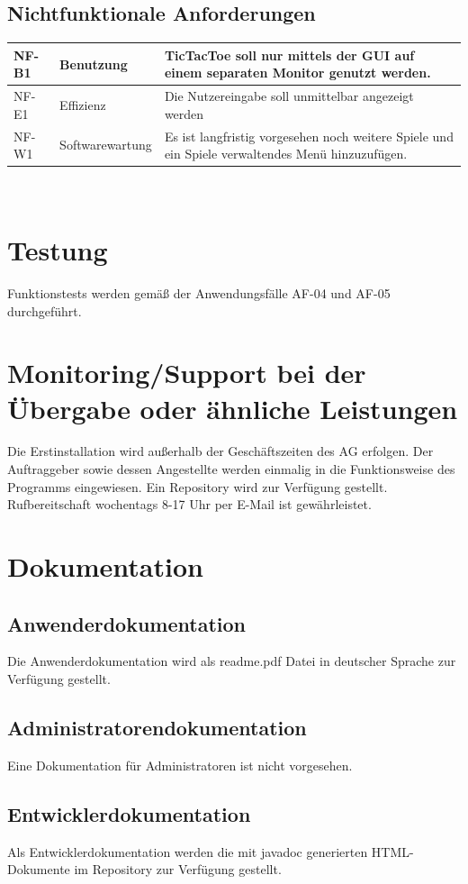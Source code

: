 \documentclass[12pt]{article}
\begin{document}
\subsection{Nichtfunktionale Anforderungen} 
\begin{tabularx}{\textwidth}{|X|X|X|} \hline
NF-B1&Benutzung&\Gls{TicTacToe} soll nur mittels der GUI auf einem separaten Monitor genutzt werden.\\ \hline
NF-E1&Effizienz&Die Nutzereingabe soll unmittelbar angezeigt werden\\ \hline
NF-W1&Softwarewartung&Es ist langfristig vorgesehen noch weitere Spiele und ein Spiele verwaltendes Menü hinzuzufügen. \\ \hline
\end{tabularx}\\
\section{Testung}
Funktionstests werden gemäß der Anwendungsfälle AF-04 und AF-05 durchgeführt.

\section{Monitoring/Support bei der Übergabe oder ähnliche Leistungen}
Die Erstinstallation wird außerhalb der Geschäftszeiten des AG erfolgen. Der Auftraggeber sowie dessen Angestellte werden einmalig in die Funktionsweise des Programms eingewiesen. Ein \Gls{Repository} wird zur Verfügung gestellt. Rufbereitschaft wochentags 8-17 Uhr per E-Mail ist gewährleistet. 

\section{Dokumentation}
\subsection{Anwenderdokumentation}
Die Anwenderdokumentation wird als readme.pdf Datei in deutscher Sprache zur Verfügung gestellt.
\subsection{Administratorendokumentation}
Eine Dokumentation für Administratoren ist nicht vorgesehen.
\subsection{Entwicklerdokumentation}
Als Entwicklerdokumentation werden die mit javadoc generierten HTML-Dokumente im \Gls{Repository} zur Verfügung gestellt.
\end{document}

